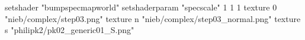 setshader "bumpspecmapworld"
setshaderparam "specscale" 1 1 1
   texture 0 "nieb/complex/step03.png"
   texture n "nieb/complex/step03_normal.png"
   texture s "philipk2/pk02_generic01_S.png"